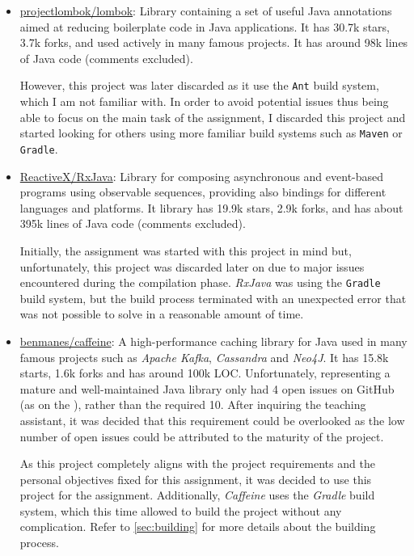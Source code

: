 \begin{itemize}
	\item \href{https://github.com/projectlombok/lombok}{projectlombok/lombok}: Library containing a set of useful Java annotations aimed at reducing boilerplate code in Java applications. It has 30.7k stars, 3.7k forks, and used actively in many famous projects. It has around 98k lines of Java code (comments excluded).

	      However, this project was later discarded as it use the \texttt{Ant} build system, which I am not familiar with. In order to avoid potential issues thus being able to focus on the main task of the assignment, I discarded this project and started looking for others using more familiar build systems such as \texttt{Maven} or \texttt{Gradle}.

	\item \href{https://github.com/ReactiveX/RxJava}{ReactiveX/RxJava}: Library for composing asynchronous and event-based programs using observable sequences, providing also bindings for different languages and platforms. It library has 19.9k stars, 2.9k forks, and has about 395k lines of Java code (comments excluded).

	      Initially, the assignment was started with this project in mind but, unfortunately, this project was discarded later on due to major issues encountered during the compilation phase. \textit{RxJava} was using the \texttt{Gradle} build system, but the build process terminated with an unexpected error that was not possible to solve in a reasonable amount of time.

	\item \href{https://github.com/ben-manes/caffeine}{benmanes/caffeine}: A high-performance caching library for Java used in many famous projects such as \textit{Apache Kafka}, \textit{Cassandra} and \textit{Neo4J}. It has 15.8k starts, 1.6k forks and has around 100k LOC. Unfortunately, representing a mature and well-maintained Java library only had 4 open issues on GitHub (as on the ), rather than the required 10. After inquiring the teaching assistant, it was decided that this requirement could be overlooked as the low number of open issues could be attributed to the maturity of the project.

	      As this project completely aligns with the project requirements and the personal objectives fixed for this assignment, it was decided to use this project for the assignment. Additionally, \textit{Caffeine} uses the \textit{Gradle} build system, which this time allowed to build the project without any complication. Refer to \autoref{sec:building} for more details about the building process.

\end{itemize}

